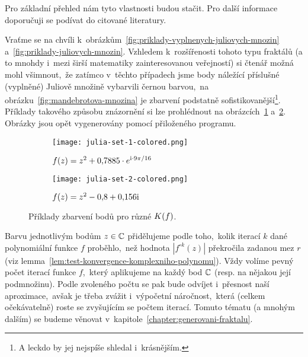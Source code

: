 Pro základní přehled nám tyto vlastnosti budou stačit. Pro další informace doporučuji se podívat do citované literatury.

Vraťme se na chvíli k~obrázkům~\ref{fig:priklady-vyplnenych-juliovych-mnozin} a~\ref{fig:priklady-juliovych-mnozin}. Vzhledem k~rozšířenosti tohoto typu fraktálů (a to mnohdy i~mezi širší matematiky zainteresovanou veřejností) si čtenář možná mohl všimnout,~že zatímco v~těchto případech jsme body náležící příslušné (vyplněné) Juliově množině vybarvili černou barvou,~na obrázku~\ref{fig:mandebrotova-mnozina} je zbarvení podstatně sofistikovanější\footnote{A leckdo by jej nejspíše shledal i~krásnějším.}. Příklady takového způsobu znázornění si lze prohlédnout na obrázcích~\ref{subfig:vyplnena-juliova-mnozina-1-obarveno} a~\ref{subfig:vyplnena-juliova-mnozina-2-obarveno}. Obrázky jsou opět vygenerovány pomocí přiloženého programu.
\begin{figure}[h]
    \centering
    \begin{subfigure}{0.48\textwidth}
        \centering
        \texttt{[image: julia-set-1-colored.png]}
        \caption{$f(z)=z^2 + 0{,}7885\cdot e^{\textrm{i}\cdot9\pi/16}$}
        \label{subfig:vyplnena-juliova-mnozina-1-obarveno}
    \end{subfigure}
    \quad
    \begin{subfigure}{0.48\textwidth}
        \centering
        \texttt{[image: julia-set-2-colored.png]}
        \caption{$f(z)=z^2 - 0{,}8 + 0{,}156\textrm{i}$}
        \label{subfig:vyplnena-juliova-mnozina-2-obarveno}
    \end{subfigure}
    \caption{Příklady zbarvení bodů pro různé $K(f)$.}
    \label{fig:priklady-vyplnenych-juliovych-mnozin-obarveno}
\end{figure}

Barvu jednotlivým bodům $z\in\mathbb{C}$ přidělujeme podle toho,~kolik iterací $k$ dané polynomiální funkce $f$ proběhlo,~než hodnota $|f^{\circ k}(z)|$ překročila zadanou mez $r$ (viz lemma~\ref{lem:test-konvergence-komplexniho-polynomu}). Vždy volíme pevný počet iterací funkce $f$,~který aplikujeme na každý bod $\mathbb{C}$ (resp. na nějakou její podmnožinu). Podle zvoleného počtu se pak bude odvíjet i~přesnost naší aproximace,~avšak je třeba zvážit i~výpočetní náročnost,~která (celkem očekávatelně) roste se zvyšujícím se počtem iterací. Tomuto tématu (a mnohým dalším) se budeme věnovat v~kapitole~\ref{chapter:generovani-fraktalu}.
 
